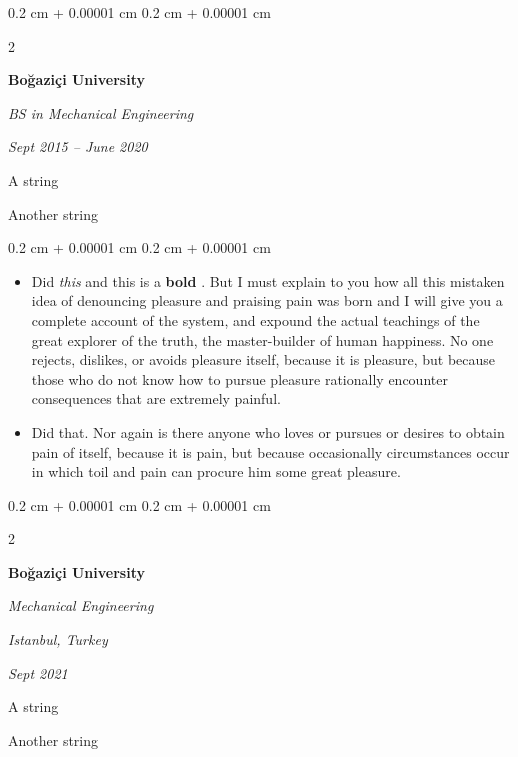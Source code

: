 \documentclass[10pt, letterpaper]{article}
\newenvironment{summary}{
    \begin{description}[
        topsep=0.10 cm,
        parsep=0.10 cm,
        partopsep=0pt,
        itemsep=0pt,
        leftmargin=0.4 cm + 10pt
    ]
}{
    \end{description}
} %
\newenvironment{highlights}{
    \begin{itemize}[
        topsep=0.10 cm,
        parsep=0.10 cm,
        partopsep=0pt,
        itemsep=0pt,
        leftmargin=0.4 cm + 10pt
    ]
}{
    \end{itemize}
} %
\newenvironment{onecolentry}{
    \begin{adjustwidth}{
        0.2 cm + 0.00001 cm
    }{
        0.2 cm + 0.00001 cm
    }
}{
    \end{adjustwidth}
} %
\newenvironment{twocolentry}[2][]{
    \onecolentry
    \def\secondColumn{#2}
    \setcolumnwidth{\fill, 4.5 cm}
    \begin{paracol}{2}
}{
    \switchcolumn \raggedleft \secondColumn
    \end{paracol}
    \endonecolentry
} %
\let\hrefWithoutArrow\href
\renewcommand{\href}[2]{\hrefWithoutArrow{#1}{\ifthenelse{\equal{#2}{}}{ }{#2 }\raisebox{.15ex}{\footnotesize \faExternalLink*}}}
\begin{document}
        \begin{twocolentry}{
            
            
        \textit{Sept 2015 – June 2020}}
            \textbf{Boğaziçi University}

            \textit{BS in Mechanical Engineering}
        \end{twocolentry}
            \begin{summary}
                \item A string
                \item Another string
            \end{summary}
        \vspace{0.10 cm}
        \begin{onecolentry}
            \begin{highlights}
                \item Did \textit{this} and this is a \textbf{bold} \href{https://example.com}{link}. But I must explain to you how all this mistaken idea of denouncing pleasure and praising pain was born and I will give you a complete account of the system, and expound the actual teachings of the great explorer of the truth, the master-builder of human happiness. No one rejects, dislikes, or avoids pleasure itself, because it is pleasure, but because those who do not know how to pursue pleasure rationally encounter consequences that are extremely painful.
                \item Did that. Nor again is there anyone who loves or pursues or desires to obtain pain of itself, because it is pain, but because occasionally circumstances occur in which toil and pain can procure him some great pleasure.
            \end{highlights}
        \end{onecolentry}


        \vspace{0.2 cm}

        \begin{twocolentry}{
        \textit{Istanbul, Turkey}    
            
        \textit{Sept 2021}}
            \textbf{Boğaziçi University}

            \textit{Mechanical Engineering}
        \end{twocolentry}
            \begin{summary}
                \item A string
                \item Another string
            \end{summary}
\end{document}
